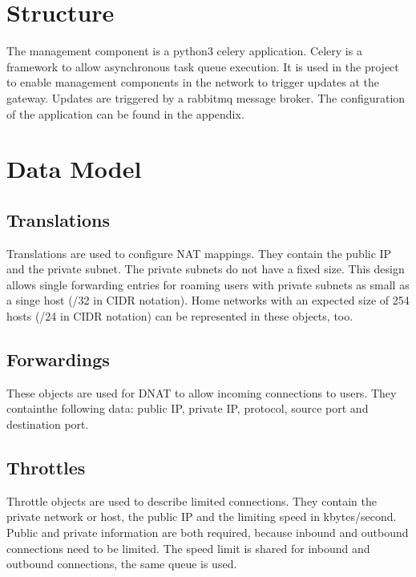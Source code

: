 \documentclass{report}
\begin{document}
\section{Structure}\label{structure}

The management component is a python3 celery application. Celery is a
framework to allow asynchronous task queue execution\cite{celery}. It is used
in the project to enable management components in the network to trigger
updates at the gateway. Updates are triggered by a rabbitmq message
broker\cite{rabbit}. The configuration of the application can be found in the
appendix.


\section{Data Model}\label{data-model}

\subsection{Translations}\label{translations}

Translations are used to configure NAT mappings. They contain the public
IP and the private subnet. The private subnets do not have a fixed size.
This design allows single forwarding entries for roaming users with
private subnets as small as a singe host (/32 in CIDR notation). Home
networks with an expected size of 254 hosts (/24 in CIDR notation) can
be represented in these objects, too.

\subsection{Forwardings}\label{forwardings}

These objects are used for DNAT to allow incoming connections to users.
They containthe following data: public IP, private IP, protocol, source
port and destination port.

\subsection{Throttles}\label{throttles}

Throttle objects are used to describe limited connections. They contain
the private network or host, the public IP and the limiting speed in
kbytes/second. Public and private information are both required, because
inbound and outbound connections need to be limited. The speed limit is
shared for inbound and outbound connections, the same queue is used.
\end{document}
